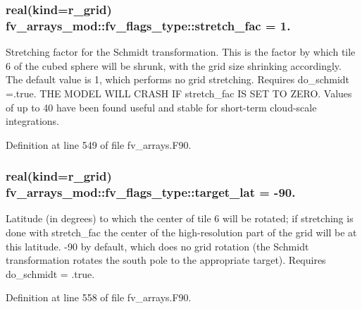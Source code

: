 \subsubsection[{stretch\-\_\-fac}]{\setlength{\rightskip}{0pt plus 5cm}real(kind={\bf r\-\_\-grid}) fv\-\_\-arrays\-\_\-mod\-::fv\-\_\-flags\-\_\-type\-::stretch\-\_\-fac = 1.}\label{structfv__arrays__mod_1_1fv__flags__type_acb5e88bae05f9848ec4b18ef1f7bcd1e}


Stretching factor for the Schmidt transformation. This is the factor by which tile 6 of the cubed sphere will be shrunk, with the grid size shrinking accordingly. The default value is 1, which performs no grid stretching. Requires do\-\_\-schmidt =.true. T\-H\-E M\-O\-D\-E\-L W\-I\-L\-L C\-R\-A\-S\-H I\-F stretch\-\_\-fac I\-S S\-E\-T T\-O Z\-E\-R\-O. Values of up to 40 have been found useful and stable for short-\/term cloud-\/scale integrations. 



Definition at line 549 of file fv\-\_\-arrays.\-F90.

\subsubsection[{target\-\_\-lat}]{\setlength{\rightskip}{0pt plus 5cm}real(kind={\bf r\-\_\-grid}) fv\-\_\-arrays\-\_\-mod\-::fv\-\_\-flags\-\_\-type\-::target\-\_\-lat = -\/90.}\label{structfv__arrays__mod_1_1fv__flags__type_aae83d2547ecc1f3f201f5ca43ce1ee01}


Latitude (in degrees) to which the center of tile 6 will be rotated; if stretching is done with stretch\-\_\-fac the center of the high-\/resolution part of the grid will be at this latitude. -\/90 by default, which does no grid rotation (the Schmidt transformation rotates the south pole to the appropriate target). Requires do\-\_\-schmidt = .true. 



Definition at line 558 of file fv\-\_\-arrays.\-F90.

